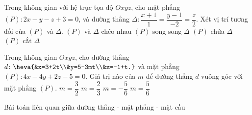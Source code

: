 	\begin{ex}%
	Trong không gian với hệ trục tọa độ $Oxyz$, cho mặt phẳng $(P)\colon2x-y-z+3=0$, và đường thẳng $\Delta\colon\dfrac{x+1}{1}=\dfrac{y-1}{-2}=\dfrac{z}{2}$. Xét vị trí tương đối của $(P)$ và $\Delta$. 
	\choice
	{$(P)$ và $\Delta$ chéo nhau}
	{$(P)$ song song $\Delta$}
	{$(P)$ chứa $\Delta$}
	{\True $(P)$ cắt $\Delta$}
	\end{ex}
	\begin{ex}%
	Trong không gian $Oxyz$, cho đường thẳng $d\colon\heva{&x=3+2t\\&y=5-3mt\\&z=-1+t.}$ và mặt phẳng $(P)\colon4x-4y+2z-5=0$. Giá trị nào của $m$ để đường thẳng $d$ vuông góc với mặt phẳng $(P)$. 
	\choice
	{$m=\dfrac{3}{2}$}
	{\True $m=\dfrac{2}{3}$}
	{$m=-\dfrac{5}{6}$}
	{$m=\dfrac{5}{6}$}
	\end{ex}
	\begin{dang}{Bài toán liên quan giữa đường thẳng - mặt phẳng - mặt cầu}%
	\end{dang}
 \setcounter{subsubsection}{0}
 \setcounter{vd}{0}
 \setcounter{ex}{0}
